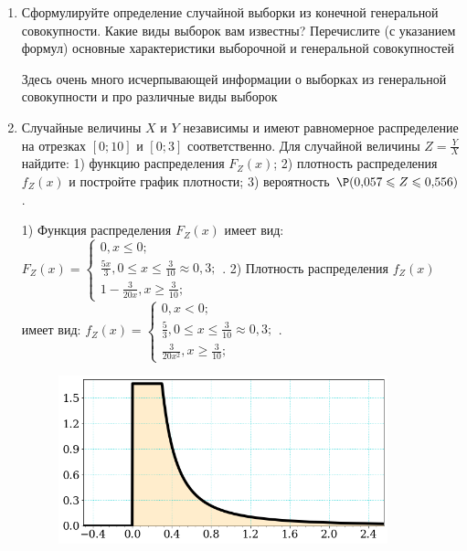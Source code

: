 \documentclass[a4paper,14pt]{article}
\begin{document}
\begin{enumerate}


\item


Сформулируйте определение случайной выборки из конечной генеральной совокупности. Какие
виды выборок вам известны? Перечислите (с указанием формул) основные характеристики выборочной и генеральной совокупностей




Здесь очень много исчерпывающей информации о выборках из генеральной совокупности и про различные виды выборок


\item

Случайные величины $X$ и $Y$ независимы и имеют равномерное
распределение на отрезках $[0;10]$ и $[0;3]$ соответственно. Для случайной величины $Z=\frac{Y}{X}$ найдите: 
1) функцию распределения $F_Z(x)$;
2) плотность распределения $f_Z(x)$ и постройте график плотности;
3) вероятность $\P(0,\!057\leqslant Z\leqslant 0,\!556)$.




1) Функция распределения $F_Z(x)$ имеет вид:
$
F_Z(x)=\left\{
\begin{array}{l}
0, x\leqslant 0;\\
\frac{5 x}{3}, 0\leqslant x\leqslant \frac{3}{10}\approx 0,\!3;\\
1 - \frac{3}{20 x}, x\geqslant\frac{3}{10};
\end{array}.
\right.
$
2) Плотность распределения $f_Z(x)$ имеет вид:
$
f_Z(x)=\left\{
\begin{array}{l}
0, x<0;\\
\frac{5}{3}, 0\leqslant x\leqslant \frac{3}{10}\approx 0,\!3;\\
\frac{3}{20 x^{2}}, x\geqslant\frac{3}{10};
\end{array}.
\right.
$


\begin{figure}[H]
    \includegraphics[width=0.9\textwidth]{2_53d1}
\end{figure}



\end{enumerate}
\end{document}
